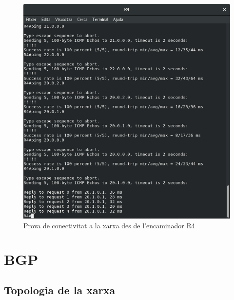 \documentclass[10pt]{article}
\begin{document}
\begin{figure}[H]
\begin{center}
\includegraphics[scale=0.5]{Images/ospf-R4-conectivity.png}
\caption{Prova de conectivitat a la xarxa des de l'encaminador R4}
\end{center}
\end{figure}
\section{BGP}
\subsection{Topologia de la xarxa}
\end{document}
